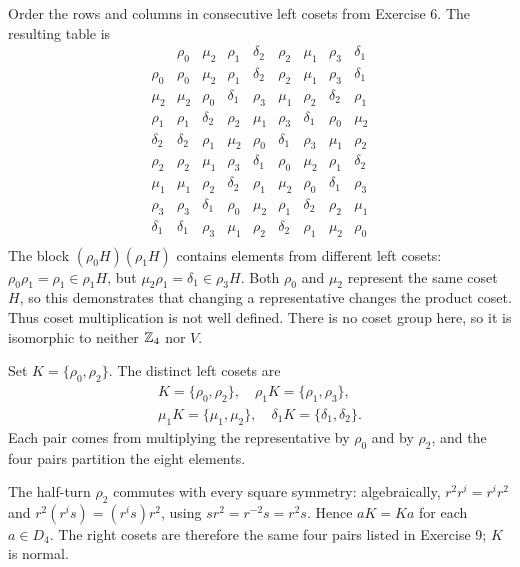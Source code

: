 Order the rows and columns in consecutive left cosets from Exercise 6. The resulting table is
\[\begin{array}{c|cccccccc} & \rho_0 & \mu_2 & \rho_1 & \delta_2 & \rho_2 & \mu_1 & \rho_3 & \delta_1\\\hline
\rho_0 & \rho_0 & \mu_2 & \rho_1 & \delta_2 & \rho_2 & \mu_1 & \rho_3 & \delta_1\\
\mu_2 & \mu_2 & \rho_0 & \delta_1 & \rho_3 & \mu_1 & \rho_2 & \delta_2 & \rho_1\\
\rho_1 & \rho_1 & \delta_2 & \rho_2 & \mu_1 & \rho_3 & \delta_1 & \rho_0 & \mu_2\\
\delta_2 & \delta_2 & \rho_1 & \mu_2 & \rho_0 & \delta_1 & \rho_3 & \mu_1 & \rho_2\\
\rho_2 & \rho_2 & \mu_1 & \rho_3 & \delta_1 & \rho_0 & \mu_2 & \rho_1 & \delta_2\\
\mu_1 & \mu_1 & \rho_2 & \delta_2 & \rho_1 & \mu_2 & \rho_0 & \delta_1 & \rho_3\\
\rho_3 & \rho_3 & \delta_1 & \rho_0 & \mu_2 & \rho_1 & \delta_2 & \rho_2 & \mu_1\\
\delta_1 & \delta_1 & \rho_3 & \mu_1 & \rho_2 & \delta_2 & \rho_1 & \mu_2 & \rho_0\\\end{array}\]
The block $(\rho_0H)(\rho_1H)$ contains elements from different left cosets: $\rho_0\rho_1=\rho_1\in\rho_1H$, but $\mu_2\rho_1=\delta_1\in\rho_3H$. Both $\rho_0$ and $\mu_2$ represent the same coset $H$, so this demonstrates that changing a representative changes the product coset. Thus coset multiplication is not well defined. There is no coset group here, so it is isomorphic to neither $\mathbb{Z}_4$ nor $V$.

Set $K=\{\rho_0,\rho_2\}$. The distinct left cosets are
\[\begin{gathered}
K=\{\rho_0,\rho_2\},\quad \rho_1K=\{\rho_1,\rho_3\},\\
\mu_1K=\{\mu_1,\mu_2\},\quad \delta_1K=\{\delta_1,\delta_2\}.
\end{gathered}\]
Each pair comes from multiplying the representative by $\rho_0$ and by $\rho_2$, and the four pairs partition the eight elements.

The half-turn $\rho_2$ commutes with every square symmetry: algebraically, $r^2r^i=r^ir^2$ and $r^2(r^is)=(r^is)r^2$, using $sr^2=r^{-2}s=r^2s$. Hence $aK=Ka$ for each $a\in D_4$. The right cosets are therefore the same four pairs listed in Exercise 9; $K$ is normal.

